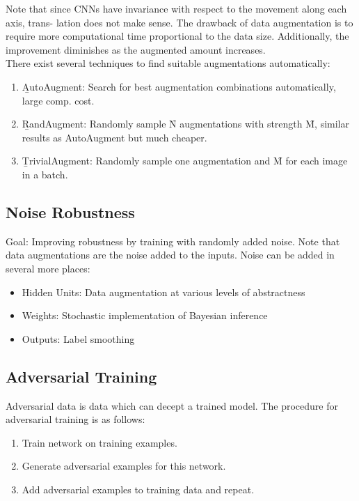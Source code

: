 Note that since CNNs have invariance with respect to the movement along each axis, trans-
lation does not make sense. The drawback of data augmentation is to require more computational time proportional to the data size. Additionally, the improvement diminishes as the augmented amount increases.\\

There exist several techniques to find suitable augmentations automatically:
\begin{enumerate}
    \item \b{AutoAugment:} Search for best augmentation combinations automatically, large comp. cost.
    \item \b{RandAugment:} Randomly sample \f{N} augmentations with strength \f{M}, similar results as AutoAugment but much cheaper.
    \item \b{TrivialAugment:} Randomly sample one augmentation and \f{M} for each image in a batch.
\end{enumerate}

\subsection{Noise Robustness}
Goal: Improving robustness by training with randomly added noise. Note that data augmentations are the noise added to the inputs. Noise can be added in several more places:
\begin{itemize}
    \item Hidden Units: Data augmentation at various levels of abstractness
    \item Weights: Stochastic implementation of Bayesian inference
    \item Outputs: Label smoothing
\end{itemize}

\subsection{Adversarial Training}
Adversarial data is data which can decept a trained model. The procedure for adversarial training is as follows:
\begin{enumerate}
    \item Train network on training examples.
    \item Generate adversarial examples for this network.
    \item Add adversarial examples to training data and repeat.
\end{enumerate}


